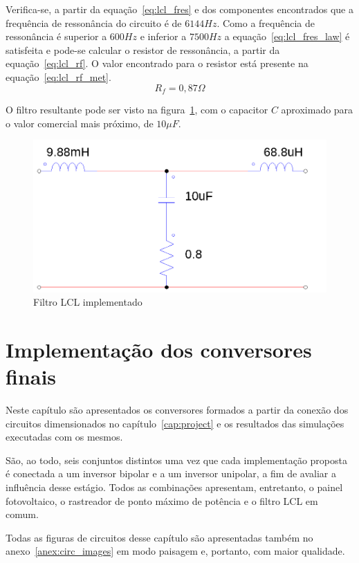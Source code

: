 \documentclass[
	12pt,				%
	openany,
	onseside,
	a4paper,			%
	english,			%
	french,				%
	spanish,			%
	brazil,				%
	]{abntex2}
\begin{document}
Verifica-se, a partir da equação~\ref{eq:lcl_fres} e dos componentes encontrados que a frequência de ressonância do circuito é de $6144Hz$. Como a frequência de ressonância é superior a $600Hz$ e inferior a $7500Hz$ a equação~\ref{eq:lcl_fres_law} é satisfeita e pode-se calcular o resistor de ressonância, a partir da equação~\ref{eq:lcl_rf}. O valor encontrado para o resistor está presente na equação~\ref{eq:lcl_rf_met}.
\begin{equation}%
	R_f = 0,87 \Omega \label{eq:lcl_rf_met}
\end{equation}

O filtro resultante pode ser visto na figura~\ref{fig:lcl_filter_impl}, com o capacitor $C$ aproximado para o valor comercial mais próximo, de $10 \mu F$.

\begin{figure}[H]%
	\begin{center}%
		\includegraphics[width=0.65 \linewidth]{lcl_filter_psim}
		\caption{Filtro LCL implementado}
		\label{fig:lcl_filter_impl}
	\end{center}
\end{figure}

\chapter{Implementação dos conversores finais}

Neste capítulo são apresentados os conversores formados a partir da conexão dos circuitos dimensionados no capítulo~\ref{cap:project} e os resultados das simulações executadas com os mesmos.

São, ao todo, seis conjuntos distintos uma vez que cada implementação proposta é conectada a um inversor bipolar e a um inversor unipolar, a fim de avaliar a influência desse estágio. Todos as combinações apresentam, entretanto, o painel fotovoltaico, o rastreador de ponto máximo de potência e o filtro LCL em comum.

Todas as figuras de circuitos desse capítulo são apresentadas também no anexo~\ref{anex:circ_images} em modo paisagem e, portanto, com maior qualidade.
\end{document}

